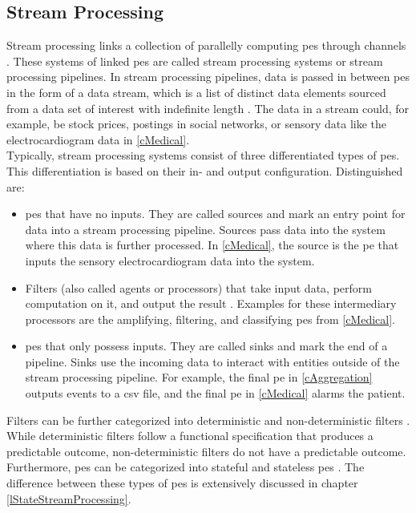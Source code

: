 \subsection{Stream Processing}
\label{lStreamProcessing}
Stream processing links a collection of parallelly computing \gls{pe}s through channels \cite{Stephens.1997}. These systems of linked \gls{pe}s are called stream processing systems \cite{Stephens.1997} or stream processing pipelines. In stream processing pipelines, data is passed in between \gls{pe}s in the form of a data stream, which is a list of distinct data elements sourced from a data set of interest with indefinite length \cite{Stephens.1997}. The data in a stream could, for example, be stock prices, postings in social networks, or sensory data \cite{Hesse.2015} like the electrocardiogram data in \ref{cMedical}.\\
Typically, stream processing systems consist of three differentiated types of \gls{pe}s. This differentiation is based on their in- and output configuration. Distinguished are:
\begin{itemize}
    \item \gls{pe}s that have no inputs. They are called sources \cite{Stephens.1997} and mark an entry point for data into a stream processing pipeline. Sources pass data into the system where this data is further processed. In \ref{cMedical}, the source is the \gls{pe} that inputs the sensory electrocardiogram data into the system.
    \item Filters (also called agents or processors) that take input data, perform computation on it, and output the result \cite{Stephens.1997}. Examples for these intermediary processors are the amplifying, filtering, and classifying \gls{pe}s from \ref{cMedical}.
    \item \gls{pe}s that only possess inputs. They are called sinks \cite{Stephens.1997} and mark the end of a pipeline. Sinks use the incoming data to interact with entities outside of the stream processing pipeline. For example, the final \gls{pe} in \ref{cAggregation} outputs events to a \gls{csv} file, and the final \gls{pe} in \ref{cMedical} alarms the patient.
\end{itemize}

Filters can be further categorized into deterministic and non-deterministic filters \cite{Stephens.1997}. While deterministic filters follow a functional specification that produces a predictable outcome, non-deterministic filters do not have a predictable outcome.\\
Furthermore, \gls{pe}s can be categorized into stateful and stateless \gls{pe}s \cite{CastroFernandez.2013}. The difference between these types of \gls{pe}s is extensively discussed in chapter \ref{lStateStreamProcessing}.

